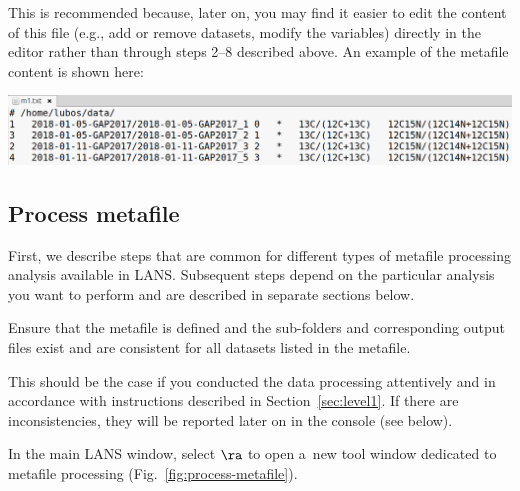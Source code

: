 \nb
\bul This is recommended because, later on, you may find it easier to edit the content of this file (e.g., add or remove datasets, modify the variables) directly in the editor rather than through steps 2--8 described above. An example of the metafile content is shown here:
\begin{center}
\includegraphics[scale=0.35]{figs3/LANS-metafile-m1}
\end{center}


\subsection{Process metafile}
\setcounter{step}{0}

\goldbox{}
First, we describe steps that are common for different types of metafile processing analysis available in LANS. Subsequent steps depend on the particular analysis you want to perform and are described in separate sections below.
\tcbe

\s Ensure that the metafile is defined and the sub-folders and corresponding output files exist and are consistent for all datasets listed in the metafile.

\nb
\bul This should be the case if you conducted the data processing attentively and in accordance with instructions described in Section~\ref{sec:level1}. If there are inconsistencies, they will be reported later on in the console (see below).

\s In the main LANS window, select  $\ra$  to open a~new tool window dedicated to metafile processing (Fig.~\ref{fig:process-metafile}).

